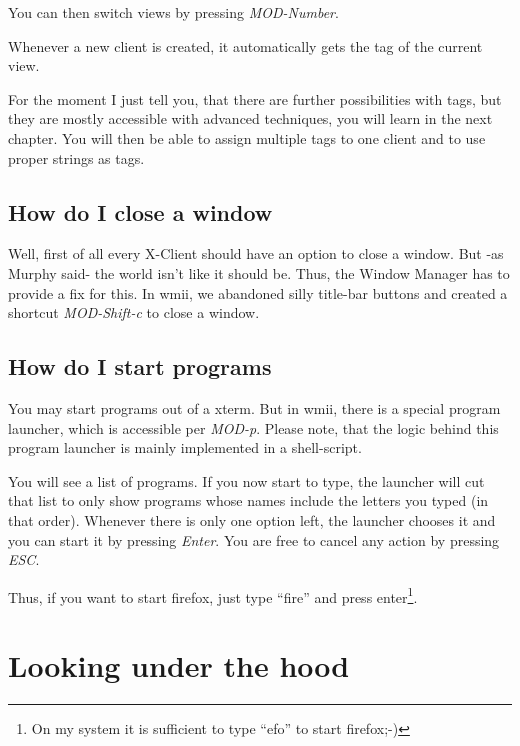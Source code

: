\documentclass[12pt,a4paper]{article} %
\begin{document}
    You can then switch views by pressing \emph{MOD-Number}.

    Whenever a new client is created, it automatically gets the tag of
    the current view.


    For the moment I just tell you, that there are further
    possibilities with tags, but they are mostly accessible with
    advanced techniques, you will learn in the next chapter. You will
    then be able to assign multiple tags to one client and to use
    proper strings as tags.

  \subsection{How do I close a window}

    Well, first of all every X-Client should have an option to close a
    window. But -as Murphy said- the world isn't like it should
    be. Thus, the Window Manager has to provide a fix for this. In
    wmii, we abandoned silly title-bar buttons and created a shortcut
    \emph{MOD-Shift-c} to close a window.

  \subsection{How do I start programs}

    You may start programs out of a xterm. But in wmii, there is a
    special program launcher, which is accessible per
    \emph{MOD-p}. Please note, that the logic behind this program
    launcher is mainly implemented in a shell-script.

    You will see a list of programs. If you now start to type, the
    launcher will cut that list to only show programs whose names
    include the letters you typed (in that order). Whenever there is
    only one option left, the launcher chooses it and you can start it
    by pressing \emph{Enter}. You are free to cancel any action by
    pressing \emph{ESC}.

    Thus, if you want to start firefox, just type ``fire'' and press
    enter\footnote{On my system it is sufficient to type ``efo'' to
    start firefox;-)}.

\section{Looking under the hood}
\end{document}
